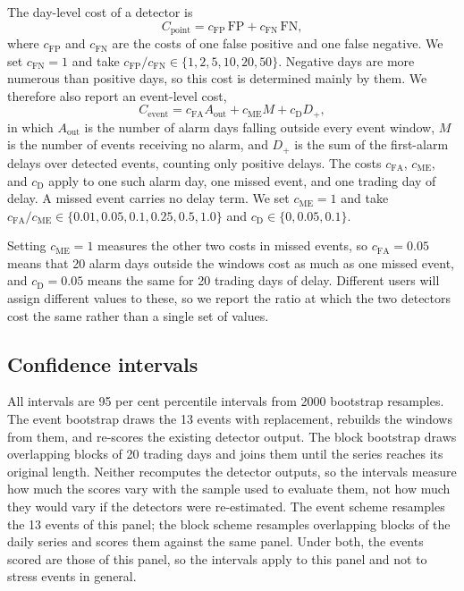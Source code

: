 \documentclass[pdflatex,sn-mathphys-num,iicol]{sn-jnl}
\begin{document}
The day-level cost of a detector is
\begin{equation}
C_{\mathrm{point}}=c_{\mathrm{FP}}\,\mathrm{FP}+c_{\mathrm{FN}}\,\mathrm{FN},
\end{equation}
where $c_{\mathrm{FP}}$ and $c_{\mathrm{FN}}$ are the costs of one false positive and one false negative. We set $c_{\mathrm{FN}}=1$ and take $c_{\mathrm{FP}}/c_{\mathrm{FN}}\in\{1,2,5,10,20,50\}$. Negative days are more numerous than positive days, so this cost is determined mainly by them. We therefore also report an event-level cost,
\begin{equation}
\label{eq:eventcost}
C_{\mathrm{event}}=c_{\mathrm{FA}}A_{\mathrm{out}}+c_{\mathrm{ME}}M+c_{\mathrm{D}}D_+,
\end{equation}
in which $A_{\mathrm{out}}$ is the number of alarm days falling outside every event window, $M$ is the number of events receiving no alarm, and $D_+$ is the sum of the first-alarm delays over detected events, counting only positive delays. The costs $c_{\mathrm{FA}}$, $c_{\mathrm{ME}}$, and $c_{\mathrm{D}}$ apply to one such alarm day, one missed event, and one trading day of delay. A missed event carries no delay term. We set $c_{\mathrm{ME}}=1$ and take $c_{\mathrm{FA}}/c_{\mathrm{ME}}\in\{0.01,0.05,0.1,0.25,0.5,1.0\}$ and $c_{\mathrm{D}}\in\{0,0.05,0.1\}$.

Setting $c_{\mathrm{ME}}=1$ measures the other two costs in missed events, so $c_{\mathrm{FA}}=0.05$ means that 20 alarm days outside the windows cost as much as one missed event, and $c_{\mathrm{D}}=0.05$ means the same for 20 trading days of delay. Different users will assign different values to these, so we report the ratio at which the two detectors cost the same rather than a single set of values.

\subsection{Confidence intervals}
All intervals are 95 per cent percentile intervals from 2000 bootstrap resamples. The event bootstrap draws the 13 events with replacement, rebuilds the windows from them, and re-scores the existing detector output. The block bootstrap draws overlapping blocks of 20 trading days and joins them until the series reaches its original length. Neither recomputes the detector outputs, so the intervals measure how much the scores vary with the sample used to evaluate them, not how much they would vary if the detectors were re-estimated. The event scheme resamples the 13 events of this panel; the block scheme resamples overlapping blocks of the daily series and scores them against the same panel. Under both, the events scored are those of this panel, so the intervals apply to this panel and not to stress events in general.
\end{document}
